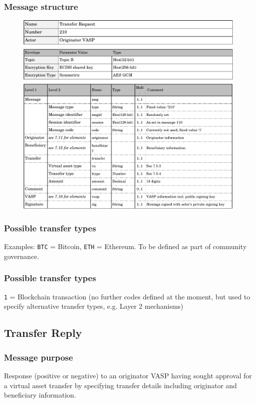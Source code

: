 \documentclass{article}
\begin{document}
\subsubsection{Message structure}
\begin{figure}[h]
    \centering
    \includegraphics[width=\textwidth]{g22.pdf}
\end{figure}
\subsubsection{Possible transfer types}
Examples: \verb+BTC+ = Bitcoin, \verb+ETH+ = Ethereum.
To be defined as part of community governance.
\subsubsection{Possible transfer types}
\verb+1+ = Blockchain transaction (no further codes defined at the moment, but used to specify alternative transfer types, e.g. Layer 2 mechanisms)
\newpage

\subsection{Transfer Reply}
\subsubsection{Message purpose}
Response (positive or negative) to an originator VASP having sought approval for a virtual asset transfer by specifying transfer details including originator and beneficiary information.
\vspace{-1em}
\end{document}
